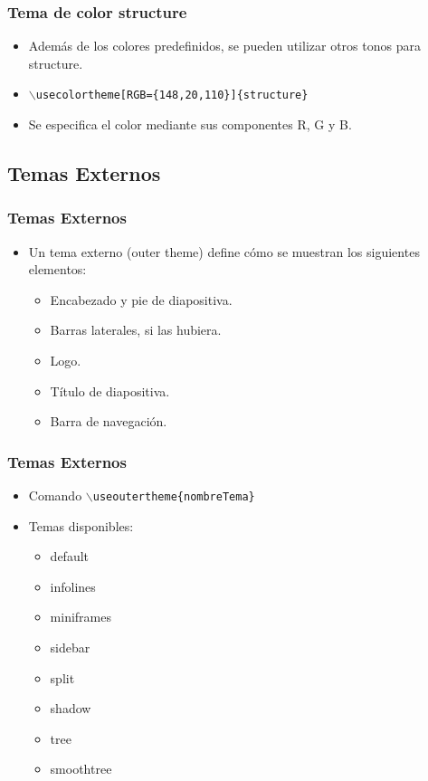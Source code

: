 \documentclass[aspectratio=1610]{beamer}%
\newcommand\rojo[1]{\textcolor[RGB]{237,41,57}{#1}}
\begin{document}
\begin{frame}[fragile]
\frametitle{\textbf{Tema de color structure}}
\justifying
\begin{itemize}\justifying
  \item Además de los colores predefinidos, se pueden utilizar otros tonos para structure.
  \item [] \texttt{$\backslash$usecolortheme\rojo{[RGB=\{148,20,110\}]}\{structure\}}
  \item Se especifica el color mediante sus componentes R, G y B.
\end{itemize}
\end{frame}


\subsection{Temas Externos}
\begin{frame}[fragile]
\frametitle{\textbf{Temas Externos}}
\justifying
 \begin{itemize}\justifying
  \item Un tema externo (outer theme) define cómo se muestran los siguientes elementos:
  \begin{itemize}\justifying
  \item Encabezado y pie de diapositiva.
  \item Barras laterales, si las hubiera.
  \item Logo.
  \item Título de diapositiva.
  \item Barra de navegación.
\end{itemize}

\end{itemize}

\end{frame}

\begin{frame}[fragile]
\frametitle{\textbf{Temas Externos}}
\justifying
 \begin{itemize}\justifying
  \item Comando \texttt{$\backslash$useoutertheme\{nombreTema\}}
  \item Temas disponibles:
  \begin{itemize}\justifying
  \item default
  \item infolines
  \item miniframes
  \item sidebar
  \item split
  \item shadow
  \item tree
  \item smoothtree
\end{itemize}

\end{itemize}

\end{frame}
\end{document}
